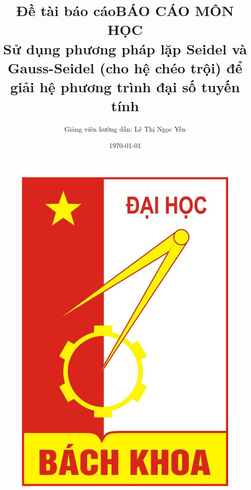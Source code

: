 \documentclass[12pt,a4paper]{article}
\begin{document}
\fontsize{12}{16}\selectfont %
{}   %

\author{Giảng viên hướng dẫn: Lê Thị Ngọc Yến}    %
\title{Đề tài báo cáo}    %

\title{BÁO CÁO MÔN HỌC \\Sử dụng phương pháp lặp Seidel và Gauss-Seidel (cho hệ chéo trội) để giải hệ phương trình đại số tuyến tính}
\date{\today{}}  %

\maketitle{}   %
\begin{center}       %
    \begin{figure}[htp]
    \begin{center}
     \includegraphics[scale=.2]{logo}
    \end{center}
    \label{}
    \end{figure}
\end{center}
\end{document}
